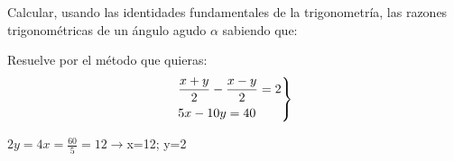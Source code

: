 \documentclass[addpoints,spanish, 12pt,a4paper]{exam}
\begin{document}
\begin{questions}






\question Calcular, usando las identidades fundamentales de la trigonometría, las razones trigonométricas de un ángulo agudo $\alpha$ sabiendo que: 

\question[1] Resuelve por el método que quieras:
$$\left. \begin{gathered}
	  \frac{{x + y}}{2} - \frac{{x - y}}{2} = 2 \hfill \\
	  5x - 10y = 40 \hfill \\ 
	\end{gathered}  \right\rbrace$$
	\begin{solution}  $2y=4 x=\frac{60}{5}=12 \to $x=12; y=2 \end{solution}
	

\end{questions}
\end{document}
